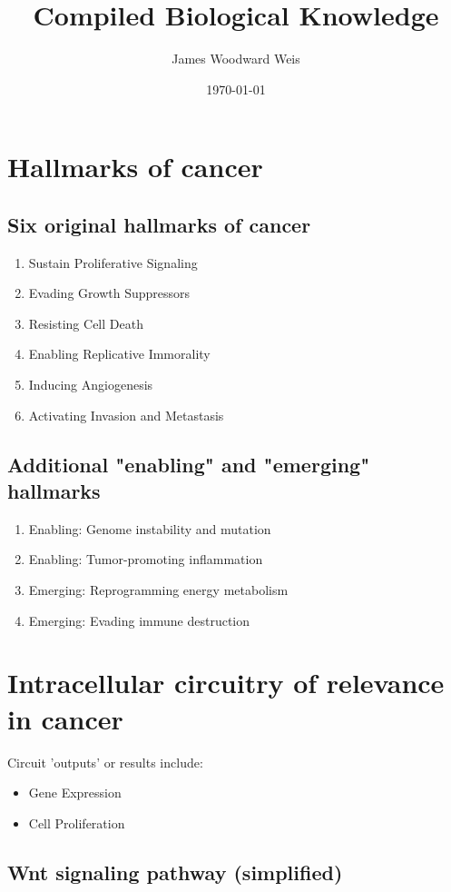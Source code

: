 \documentclass[11pt]{article}
\author{James Woodward Weis}
\date{\today}
\title{Compiled Biological Knowledge}
\begin{document}
\maketitle
\tableofcontents

\section{Hallmarks of cancer}
\label{sec-1}

\subsection{Six original hallmarks of cancer}
\label{sec-1-1}
\begin{enumerate}
\item Sustain Proliferative Signaling
\item Evading Growth Suppressors
\item Resisting Cell Death
\item Enabling Replicative Immorality
\item Inducing Angiogenesis
\item Activating Invasion and Metastasis
\end{enumerate}
\subsection{Additional "enabling" and "emerging" hallmarks}
\label{sec-1-2}
\begin{enumerate}
\item Enabling: Genome instability and mutation
\item Enabling: Tumor-promoting inflammation
\item Emerging: Reprogramming energy metabolism
\item Emerging: Evading immune destruction
\end{enumerate}
\section{Intracellular circuitry of relevance in cancer}
\label{sec-2}
Circuit 'outputs' or results include:
\begin{itemize}
\item Gene Expression
\item Cell Proliferation
\end{itemize}
\subsection{Wnt signaling pathway (simplified)}
\label{sec-2-1}
\end{document}
